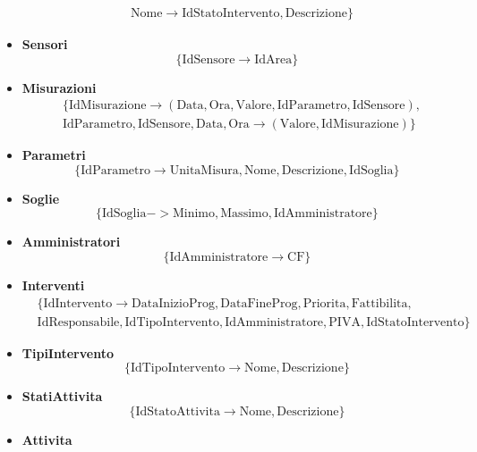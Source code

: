 \begin{itemize}
\begin{align*}
		& \text{Nome} \to \text{IdStatoIntervento}, \text{Descrizione}\}
	\end{align*}
	\item \textbf{Sensori}
	\begin{equation*}
		\{\text{IdSensore} \to \text{IdArea}\}
	\end{equation*}
	\item \textbf{Misurazioni}
	\begin{align*}
		& \{\text{IdMisurazione} \to (\text{Data}, \text{Ora}, \text{Valore}, \text{IdParametro}, \text{IdSensore}),\\
		& \text{IdParametro}, \text{IdSensore}, \text{Data}, \text{Ora} \to (\text{Valore}, \text{IdMisurazione})\}
	\end{align*}
	\item \textbf{Parametri}
	\begin{equation*}
		\{\text{IdParametro} \to \text{UnitaMisura},\text{Nome}, \text{Descrizione}, \text{IdSoglia}\}
	\end{equation*}
	\item \textbf{Soglie}
	\begin{equation*}
		\{\text{IdSoglia}->\text{Minimo}, \text{Massimo}, \text{IdAmministratore}\}
	\end{equation*}
	\item \textbf{Amministratori}
	\begin{equation*}
		\{\text{IdAmministratore}\to\text{CF}\}
	\end{equation*}
	\item \textbf{Interventi}
	\begin{align*}
		&\{\text{IdIntervento}\to\text{DataInizioProg}, \text{DataFineProg}, \text{Priorita}, \text{Fattibilita},\\ &\text{IdResponsabile}, \text{IdTipoIntervento}, \text{IdAmministratore}, \text{PIVA}, \text{IdStatoIntervento}\}
	\end{align*}
	\item \textbf{TipiIntervento}
	\begin{equation*}
		\{\text{IdTipoIntervento}\to\text{Nome}, \text{Descrizione}\}
	\end{equation*}
	\item \textbf{StatiAttivita}
	\begin{equation*}
		\{\text{IdStatoAttivita}\to\text{Nome}, \text{Descrizione}\}
	\end{equation*}
	\item \textbf{Attivita}
	\begin{equation*}

\end{equation*}
\end{itemize}
